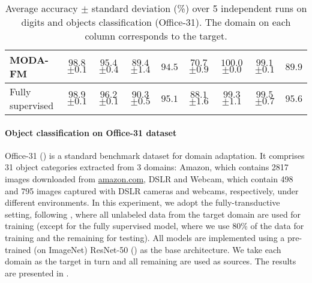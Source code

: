 \begin{table}
{\begin{tabular}{l|ccc:c|ccc:c}
        MODA-FM                      & $ 98.8 $ \tiny{$ \pm 0.1 $}  & $\boldsymbol{95.4}$ \tiny{$\pm 0.4$}  & $ 89.4 $ \tiny{$ \pm 1.4 $} & $\boldsymbol{94.5}$ & $\boldsymbol{70.7}$ \tiny{$\pm 0.9$}  & $ \boldsymbol{100.0} $ \tiny{$ \pm 0.0 $} & $ 99.1 $ \tiny{$ \pm 0.1 $} & $\boldsymbol{89.9}$\\ \hline
        Fully supervised            & $ 98.9 $ \tiny{$ \pm 0.1 $}  & $ 96.2 $ \tiny{$ \pm 0.1 $}   & $ 90.3 $ \tiny{$ \pm 0.5 $} & $95.1$ & $ 88.1 $ \tiny{$ \pm 1.6 $}   & $ 99.3 $ \tiny{$ \pm 1.1 $}       & $ 99.5 $ \tiny{$ \pm 0.7 $} & $95.6$
    \end{tabular}}
    \caption{Average accuracy $\pm$ standard deviation (\%) over 5 independent runs on digits and objects classification (Office-31). The domain on each column corresponds to the target.}
    \label{tab:digits_office_acc}
\end{table}

\paragraph{Object classification on Office-31 dataset} Office-31 (\citet{Saenko2010}) is a standard benchmark dataset for domain adaptation. It comprises 31 object categories extracted from 3 domains: Amazon, which contains 2817 images downloaded from \url{amazon.com}, DSLR and Webcam, which contain 498 and 795 images captured with DSLR cameras and webcams, respectively, under different environments. In this experiment, we adopt the fully-transductive setting, following \citet{Pei2018}, where all unlabeled data from the target domain are used for training (except for the fully supervised model, where we use 80\% of the data for training and the remaining for testing). All models are implemented using a pre-trained (on ImageNet) ResNet-50 (\citet{He2016}) as the base architecture. We take each domain as the target in turn and all remaining are used as sources. The results are presented in .

